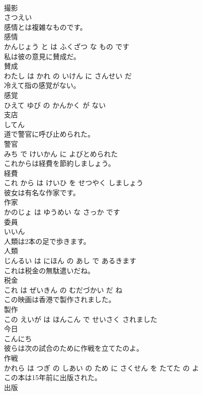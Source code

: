 \documentclass[8pt]{extreport}
\begin{document}
\begin{CJK}{UTF8}{min}
\\	撮影	
\\	さつえい			
\\	感情とは複雑なものです。	
\\	感情 
\\	かんじょう と は ふくざつ な もの です			
\\	私は彼の意見に賛成だ。	
\\	賛成 
\\	わたし は かれ の いけん に さんせい だ			
\\	冷えて指の感覚がない。	
\\	感覚 
\\	ひえて ゆび の かんかく が ない			
\\	支店	
\\	してん			
\\	道で警官に呼び止められた。	
\\	警官 
\\	みち で けいかん に よびとめられた			
\\	これからは経費を節約しましょう。	
\\	経費 
\\	これ から は けいひ を せつやく しましょう			
\\	彼女は有名な作家です。	
\\	作家 
\\	かのじょ は ゆうめい な さっか です			
\\	委員	
\\	いいん			
\\	人類は2本の足で歩きます。	
\\	人類 
\\	じんるい は にほん の あし で あるきます			
\\	これは税金の無駄遣いだね。	
\\	税金 
\\	これ は ぜいきん の むだづかい だ ね			
\\	この映画は香港で製作されました。	
\\	製作 
\\	この えいが は ほんこん で せいさく されました			
\\	今日	
\\	こんにち			
\\	彼らは次の試合のために作戦を立てたのよ。	
\\	作戦 
\\	かれら は つぎ の しあい の ため に さくせん を たてた の よ			
\\	この本は15年前に出版された。	
\\	出版 

\end{CJK}
\end{document}
